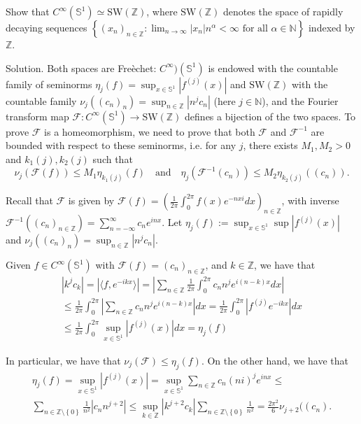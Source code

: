 \documentclass[12pt, reqno,a4paper, twoside]{amsproc}
\newcommand{\dbN}{\mathbb N}
\newcommand{\dbZ}{\mathbb Z}
\newcommand{\gen}[1]{\langle{#1}\rangle}
\newcommand{\set}[1]{\left\{{#1}\right\}}
\newcommand{\abs}[1]{\left|#1\right|}
\newcommand{\mcal}{\mathcal}
\newenvironment{sol}{\sc Solution. \rm}{\hfill \qedsymbol\bigskip}
\begin{document}
%	
\begin{exer}
	Show that $C^\infty(\mathbb {S}^1)\simeq \mathrm{SW}(\dbZ)$, where $\mathrm{SW}(\dbZ)$ denotes the space of rapidly decaying sequences $ \set{(x_n)_{n\in\dbZ}:\lim_{n\to\infty}\abs{x_n}n^\alpha<\infty\text{ for all }\alpha\in\dbN}$ indexed by $\dbZ$.
\end{exer}
\begin{sol}
	\newcommand{\F}{\mcal{F}}\newcommand{\dbS}{\mathbb S}
	Both spaces are Fre\`echet: $C^\infty)(\dbS^1)$ is endowed with the countable family of seminorms $\eta_j(f)=\sup_{x\in \dbS^1}\abs{f^{(j)}(x)}$ and $\mathrm{SW}(\dbZ)$ with the countable family $\nu_j((c_n)_n)=\sup_{n\in\dbZ}\abs{n^jc_n}$ (here $j\in\dbN$), and the Fourier transform map $\F:C^\infty(\dbS^1)\to \mathrm{SW}(\dbZ)$ defines a bijection of the two spaces. To prove $\mcal{F}$ is a homeomorphism, we need to prove that both $\F$ and $\F^{-1}$ are bounded with respect to these seminorms, i.e. for any $j$, there exists $M_1,M_2>0$ and $k_1(j),k_2(j)$ such that
	\[\nu_j(\F(f))\le M_1 \eta_{k_1(j)}(f)\quad\text{and}\quad\eta_j(\F^{-1}(c_n))\le M_2\eta_{k_2(j)}((c_n)).\]
	
	Recall that $\F$ is given by $\F(f)=\left(\frac{1}{2\pi}\int_{0}^{2\pi}f(x)e^{- n  xi}dx\right)_{n\in\dbZ}$, with inverse $\F^{-1}((c_n)_{n\in\dbZ})=\sum_{n=-\infty}^\infty c_ne^{inx}$. Let $\eta_j(f):=\sup_{x\in \dbS^1}\sup\abs{f^{(j)}(x)}$ and $\nu_j((c_n)_n)=\sup_{n\in\dbZ}\abs{n^{j}c_n}$.
	
	Given $f\in C^\infty(\dbS^1)$ with $\F(f)=(c_n)_{n\in\dbZ}$, and $k\in\dbZ$, we have that
	\begin{multline*}
	\abs{k^j c_k}=\abs{\gen{f,e^{-ikx}}}=\abs{\sum_{n\in\dbZ}\frac{1}{2\pi}\int_0^{2\pi}c_nn^j e^{i(n-k)x}dx}\\
	\le\frac{1}{2\pi}\int_0^{2\pi}\abs{\sum_{n\in\dbZ}c_nn^j e^{i(n-k) x}}dx=\frac{1}{2\pi}\int_0^{2\pi}\abs{f^{(j)}e^{-ikx}}dx\\
	\le \frac{1}{2\pi}\int_0^{2\pi}\sup_{x\in \dbS^1}\abs{f^{(j)}(x)}dx=\eta_j(f)
	\end{multline*}
	
	In particular, we have that $\nu_j(\mcal{F})\le \eta_j(f)$.
	On the other hand, we have that
	\begin{multline*}
	\eta_j(f)=\sup_{x\in\dbS^1}\abs{f^{(j)}(x)}=\sup_{x\in\dbS^1}\sum_{n\in\dbZ} c_n(ni)^j e^{inx}\le \\\sum_{n\in\dbZ\setminus{\set{0}}}\frac{1}{n^2}\abs{c_nn^{j+2}}\le\sup_{k\in\dbZ}\abs{k^{j+2}c_k}\sum_{n\in\dbZ\setminus{\set{0}}} \frac{1}{n^2}=\frac{2\pi^2}{6}\nu_{j+2}((c_n).
	\end{multline*}
	\end{sol}
\end{document}
